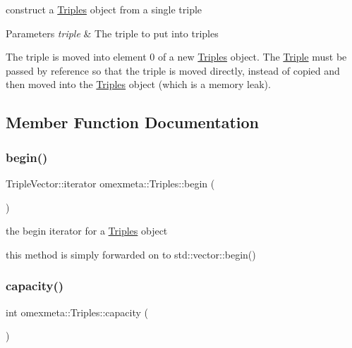 construct a \hyperlink{classomexmeta_1_1Triples}{Triples} object from a single triple 


\begin{DoxyParams}{Parameters}
{\em triple} & The triple to put into triples\\
\hline
\end{DoxyParams}
The triple is moved into element 0 of a new \hyperlink{classomexmeta_1_1Triples}{Triples} object. The \hyperlink{classomexmeta_1_1Triple}{Triple} must be passed by reference so that the triple is moved directly, instead of copied and then moved into the \hyperlink{classomexmeta_1_1Triples}{Triples} object (which is a memory leak). 

\subsection{Member Function Documentation}
\mbox{\label{classomexmeta_1_1Triples_aa6735eb506ff0d5a3179fab3af3b2602}} 
\subsubsection{\texorpdfstring{begin()}{begin()}}
{\footnotesize\ttfamily Triple\+Vector\+::iterator omexmeta\+::\+Triples\+::begin (\begin{DoxyParamCaption}{ }\end{DoxyParamCaption})}



the begin iterator for a \hyperlink{classomexmeta_1_1Triples}{Triples} object 

this method is simply forwarded on to std\+::vector\+::begin() \mbox{\label{classomexmeta_1_1Triples_a1f7ba9d5cd575ba5c63ed9dbbd1f279c}} 
\subsubsection{\texorpdfstring{capacity()}{capacity()}}
{\footnotesize\ttfamily int omexmeta\+::\+Triples\+::capacity (\begin{DoxyParamCaption}{ }\end{DoxyParamCaption})}



